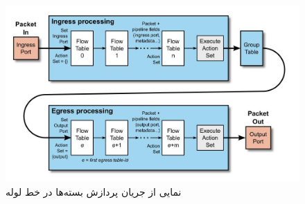 \subsection{}

\begin{figure}
	\centering
	\includegraphics[scale=0.5]{imgs/pkt_flow.jpg}
	\caption{نمایی از جریان پردازش بسته‌ها در خط لوله}
	\label{fig5}
\end{figure}

